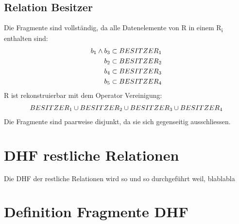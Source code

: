 \documentclass[11pt,a4paper,parskip=half]{scrartcl}
\begin{document}
\subsection{Relation Besitzer}
Die Fragmente sind vollständig, da alle Datenelemente von R in einem R\textsubscript{i} enthalten sind:\\
\begin{align*}
b\textsubscript{1} \wedge b\textsubscript{3} \subset  BESITZER\textsubscript{1}\\
b\textsubscript{2} \subset  BESITZER\textsubscript{2}\\
b\textsubscript{4} \subset  BESITZER\textsubscript{3}\\
b\textsubscript{5} \subset  BESITZER\textsubscript{4}\\
\end{align*}
R ist rekonstruierbar mit dem Operator Vereinigung:\\
\begin{align*}
BESITZER\textsubscript{1} \cup BESITZER\textsubscript{2} \cup BESITZER\textsubscript{3} \cup BESITZER\textsubscript{4}\\
\end{align*}
Die Fragmente sind paarweise disjunkt, da sie sich gegenseitig ausschliessen.

\section{DHF restliche Relationen}
Die DHF der restliche Relationen wird so und so durchgeführt weil, blablabla

\section{Definition Fragmente DHF}
\end{document}
